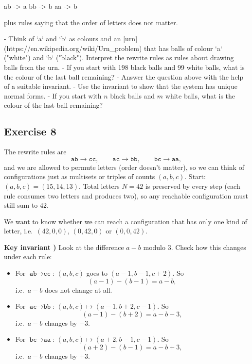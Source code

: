\documentclass[12pt]{article}
\begin{document}
        ab -> a
        bb -> b
        aa -> b
        
plus rules saying that the order of letters does not matter. 

- Think of `a` and `b` as colours and an [urn](https://en.wikipedia.org/wiki/Urn_problem) that has balls of colour `a` ("white") and `b` ("black"). Interpret the rewrite rules as rules about drawing balls from the urn.
- If you start with 198 black balls and 99 white balls, what is the colour of the last ball remaining? 
- Answer the question above with the help of a suitable invariant.
- Use the invariant to show that the system has unique normal forms.
- If you start with $n$ black balls and $m$ white balls, what is the colour of the last ball remaining?

\subsection*{Exercise 8}

The rewrite rules are
\[
\texttt{ab}\to\texttt{cc},\qquad
\texttt{ac}\to\texttt{bb},\qquad
\texttt{bc}\to\texttt{aa},
\]
and we are allowed to permute letters (order doesn't matter), so we can think of configurations just as multisets or triples of counts \((a,b,c)\).  
Start: \((a,b,c)=(15,14,13)\). Total letters \(N=42\) is preserved by every step (each rule consumes two letters and produces two), so any reachable configuration must still sum to \(42\).

We want to know whether we can reach a configuration that has only one kind of letter, i.e.\ \((42,0,0)\), \((0,42,0)\) or \((0,0,42)\).

\bigskip

\textbf{Key invariant )}  
Look at the difference \(a-b\) modulo \(3\). Check how this changes under each rule:

\begin{itemize}
  \item For \(\texttt{ab}\to\texttt{cc}\): \((a,b,c)\) goes to \((a-1,b-1,c+2)\). So
  \[
  (a-1)-(b-1)=a-b,
  \]
  i.e.\ \(a-b\) does not change at all.
  \item For \(\texttt{ac}\to\texttt{bb}\): \((a,b,c)\mapsto(a-1,b+2,c-1)\). So
  \[
  (a-1)-(b+2)=a-b-3,
  \]
  i.e.\ \(a-b\) changes by \(-3\).
  \item For \(\texttt{bc}\to\texttt{aa}\): \((a,b,c)\mapsto(a+2,b-1,c-1)\). So
  \[
  (a+2)-(b-1)=a-b+3,
  \]
  i.e.\ \(a-b\) changes by \(+3\).
\end{itemize}
\end{document}
